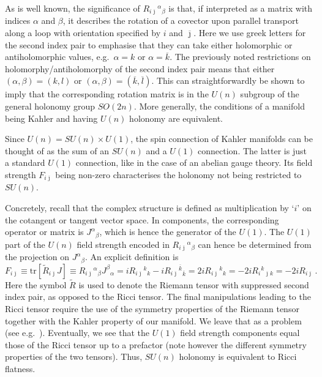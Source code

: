 \documentclass[12pt]{article}
\newcommand{\be}{\begin{equation}}
\newcommand{\ee}{\end{equation}}
\newcommand{\ol}{\overline}
\numberwithin{equation}{section}
\begin{document}
As is well known, the significance of $R_{i\ol{\jmath}}{}^\alpha{}_\beta$ is that, if interpreted as a matrix with indices $\alpha$ and $\beta$, it describes the rotation of a covector upon parallel transport along a loop with orientation specified by $i$ and $\ol{\jmath}$. Here we use greek letters for the second index pair to emphasise that they can take either holomorphic or antiholomorphic values, e.g.~$\alpha=k$ or $\alpha=\ol{k}$. The previously noted restrictions on holomorphy/antiholomorphy of the second index pair means that either $(\alpha,\beta)=(k,l)$ or $(\alpha,\beta)=(\ol{k},\ol{l})$. This can straightforwardly be shown to imply that the corresponding rotation matrix is in the $U(n)$ subgroup of the general holonomy group $SO(2n)$. More generally, the conditions of a manifold being Kahler and having $U(n)$ holonomy are equivalent. 

Since $U(n)=SU(n)\times U(1)$, the spin connection of Kahler manifolds can be thought of as the sum of an $SU(n)$ and a $U(1)$ connection. The latter is just a standard $U(1)$ connection, like in the case of an abelian gauge theory. Its field strength $F_{i\ol{\jmath}}$ being non-zero characterises the holonomy not being restricted to $SU(n)$. 

Concretely, recall that the complex structure is defined as multiplication by `$i$' on the cotangent or tangent vector space. In components, the corresponding operator or matrix is $J^\alpha{}_\beta$, which is hence the generator of the $U(1)$. The $U(1)$ part of the $U(n)$ field strength encoded in $R_{i\ol{\jmath}}{}^\alpha{}_\beta$ can hence be determined from the projection on $J^\alpha{}_\beta$. An explicit definition is
\be
F_{i\ol{\jmath}}\equiv  \mbox{tr}[ \tilde{R}_{i\ol{\jmath}} J ] \equiv R_{i\ol{\jmath}}{}^\alpha{}_\beta J^\beta{}_\alpha 
= i R_{i\ol{\jmath}}{}^k{}_k - i R_{i\ol{\jmath}}{}^{\ol{k}}{}_{\ol{k}} 
= 2i R_{i\ol{\jmath}}{}^k{}_k  = -2i R_i{}^k{}_{\ol{\jmath}k} 
= -2iR_{i\ol{\jmath}}\,.
\ee
Here the symbol $\tilde{R}$ is used to denote the Riemann tensor with suppressed second index pair, as opposed to the Ricci tensor. The final manipulations leading to the Ricci tensor require the use of the symmetry properties of the Riemann tensor together with the Kahler property of our manifold. We leave that as a problem (see e.g.~\cite{Candelas:1987is}). Eventually, we see that the $U(1)$ field strength components equal those of the Ricci tensor up to a prefactor (note however the different symmetry properties of the two tensors). Thus, $SU(n)$ holonomy is equivalent to Ricci flatness.
\end{document}
